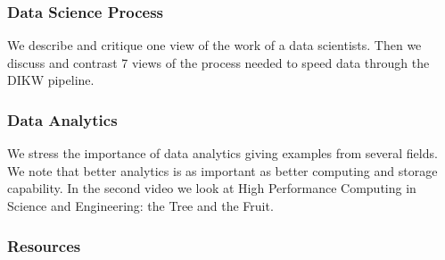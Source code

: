 \subsubsection{Data Science Process}\label{data-science-process-1}

We describe and critique one view of the work of a data scientists. Then
we discuss and contrast 7 views of the process needed to speed data
through the DIKW pipeline.




\subsubsection{Data Analytics}\label{data-analytics}



We stress the importance of data analytics giving examples from several
fields. We note that better analytics is as important as better
computing and storage capability. In the second video we look at High
Performance Computing in Science and Engineering: the Tree and the
Fruit.





\subsubsection{Resources}\label{resources-2}

